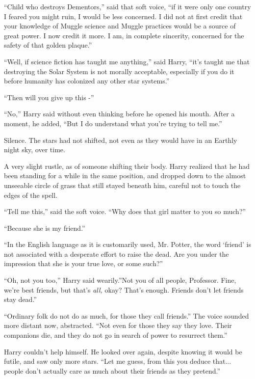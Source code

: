``Child who destroys Dementors,'' said that soft voice, ``if it were
only one country I feared you might ruin, I would be less concerned. I
did not at first credit that your knowledge of Muggle science and Muggle
practices would be a source of great power. I now credit it more. I am,
in complete sincerity, concerned for the safety of that golden plaque.''

``Well, if science fiction has taught me anything,'' said Harry, ``it's
taught me that destroying the Solar System is not morally acceptable,
especially if you do it before humanity has colonized any other star
systems.''

``Then will you give up this -''

``No,'' Harry said without even thinking before he opened his mouth.
After a moment, he added, ``But I do understand what you're trying to
tell me.''

Silence. The stars had not shifted, not even as they would have in an
Earthly night sky, over time.

A very slight rustle, as of someone shifting their body. Harry realized
that he had been standing for a while in the same position, and dropped
down to the almost unseeable circle of grass that still stayed beneath
him, careful not to touch the edges of the spell.

``Tell me this,'' said the soft voice. ``Why does that girl matter to
you so much?''

``Because she is my friend.''

``In the English language as it is customarily used, Mr. Potter, the
word `friend' is not associated with a desperate effort to raise the
dead. Are you under the impression that she is your true love, or some
such?''

``Oh, not you too,'' Harry said wearily.''Not you of all people,
Professor. Fine, we're best friends, but that's \emph{all,} okay? That's
enough. Friends don't let friends stay dead.''

``Ordinary folk do not do as much, for those they call friends.'' The
voice sounded more distant now, abstracted. ``Not even for those they
say they love. Their companions die, and they do not go in search of
power to resurrect them.''

Harry couldn't help himself. He looked over again, despite knowing it
would be futile, and saw only more stars. ``Let me guess, from this you
deduce that... people don't actually care as much about their
friends as they pretend.''

